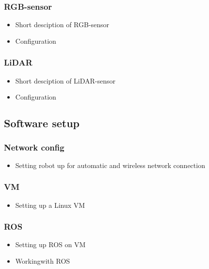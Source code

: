 \documentclass{article}
\begin{document}
            \subsubsection*{RGB-sensor}
                \begin{itemize}
                    \item Short desciption of RGB-sensor
                    \item Configuration
                \end{itemize}
            \subsubsection*{LiDAR}
                \begin{itemize}
                    \item Short desciption of LiDAR-sensor
                    \item Configuration
                \end{itemize}
        \subsection*{Software setup}
            \subsubsection*{Network config}
                \begin{itemize}
                    \item Setting robot up for automatic and wireless network connection
                \end{itemize}
            \subsubsection*{VM}
                \begin{itemize}
                    \item Setting up a Linux VM
                \end{itemize}
            \subsubsection*{ROS}
                \begin{itemize}
                    \item Setting up ROS on VM
                    \item Workingwith ROS
                \end{itemize}
\end{document}
